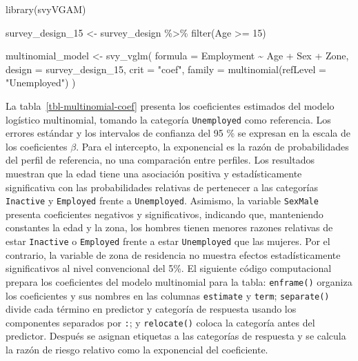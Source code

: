 \documentclass[
  spanish,
  11pt,
  letterpaper,
  oneside,
  open=any]{scrbook}
\newenvironment{Shaded}{\begin{snugshade}}{\end{snugshade}}
\newcommand{\AttributeTok}[1]{\textcolor[rgb]{0.40,0.45,0.13}{#1}}
\newcommand{\DecValTok}[1]{\textcolor[rgb]{0.68,0.00,0.00}{#1}}
\newcommand{\FunctionTok}[1]{\textcolor[rgb]{0.28,0.35,0.67}{#1}}
\newcommand{\NormalTok}[1]{\textcolor[rgb]{0.00,0.23,0.31}{#1}}
\newcommand{\OtherTok}[1]{\textcolor[rgb]{0.00,0.23,0.31}{#1}}
\newcommand{\SpecialCharTok}[1]{\textcolor[rgb]{0.37,0.37,0.37}{#1}}
\newcommand{\StringTok}[1]{\textcolor[rgb]{0.13,0.47,0.30}{#1}}
\begin{document}
\begin{Shaded}
\begin{Highlighting}[]
\FunctionTok{library}\NormalTok{(svyVGAM)}

\NormalTok{survey\_design\_15 }\OtherTok{\textless{}{-}}\NormalTok{ survey\_design }\SpecialCharTok{\%\textgreater{}\%}
  \FunctionTok{filter}\NormalTok{(Age }\SpecialCharTok{\textgreater{}=} \DecValTok{15}\NormalTok{)}

\NormalTok{multinomial\_model }\OtherTok{\textless{}{-}} \FunctionTok{svy\_vglm}\NormalTok{(}
  \AttributeTok{formula =}\NormalTok{ Employment }\SpecialCharTok{\textasciitilde{}}\NormalTok{ Age }\SpecialCharTok{+}\NormalTok{ Sex }\SpecialCharTok{+}\NormalTok{ Zone,}
  \AttributeTok{design =}\NormalTok{ survey\_design\_15,}
  \AttributeTok{crit =} \StringTok{"coef"}\NormalTok{,}
  \AttributeTok{family =} \FunctionTok{multinomial}\NormalTok{(}\AttributeTok{refLevel =} \StringTok{"Unemployed"}\NormalTok{)}
\NormalTok{)}
\end{Highlighting}
\end{Shaded}

La tabla~\ref{tbl-multinomial-coef} presenta los coeficientes estimados
del modelo logístico multinomial, tomando la categoría
\texttt{Unemployed} como referencia. Los errores estándar y los
intervalos de confianza del 95 \% se expresan en la escala de los
coeficientes \(\beta\). Para el intercepto, la exponencial es la razón
de probabilidades del perfil de referencia, no una comparación entre
perfiles. Los resultados muestran que la edad tiene una asociación
positiva y estadísticamente significativa con las probabilidades
relativas de pertenecer a las categorías \texttt{Inactive} y
\texttt{Employed} frente a \texttt{Unemployed}. Asimismo, la variable
\texttt{SexMale} presenta coeficientes negativos y significativos,
indicando que, manteniendo constantes la edad y la zona, los hombres
tienen menores razones relativas de estar \texttt{Inactive} o
\texttt{Employed} frente a estar \texttt{Unemployed} que las mujeres.
Por el contrario, la variable de zona de residencia no muestra efectos
estadísticamente significativos al nivel convencional del 5\%. El
siguiente código computacional prepara los coeficientes del modelo
multinomial para la tabla: \texttt{enframe()} organiza los coeficientes
y sus nombres en las columnas \texttt{estimate} y \texttt{term};
\texttt{separate()} divide cada término en predictor y categoría de
respuesta usando los componentes separados por \texttt{:}; y
\texttt{relocate()} coloca la categoría antes del predictor. Después se
asignan etiquetas a las categorías de respuesta y se calcula la razón de
riesgo relativo como la exponencial del coeficiente.
\end{document}
